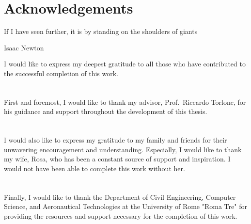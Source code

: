 
\chapter*{Acknowledgements}
\label{ch:acknowledgements}
\epigraph{If I have seen further, it is by standing on the shoulders of giants}{Isaac Newton}

I would like to express my deepest gratitude to all those who have contributed to the successful completion of this work.\\
\\
\\
First and foremost, I would like to thank my advisor, Prof.\ Riccardo Torlone, for his guidance and support throughout the development of this thesis.\\
\\
\\
I would also like to express my gratitude to my family and friends for their unwavering encouragement and understanding.
Especially, I would like to thank my wife, Rosa, who has been a constant source of support and inspiration.
I would not have been able to complete this work without her.\\
\\
\\
Finally, I would like to thank the Department of Civil Engineering, Computer Science, and Aeronautical Technologies at the University of Rome "Roma Tre" for providing the resources and support necessary for the completion of this work.

\thispagestyle{fancy}
\fancyhf{}
\renewcommand{\headrulewidth}{0pt} %
